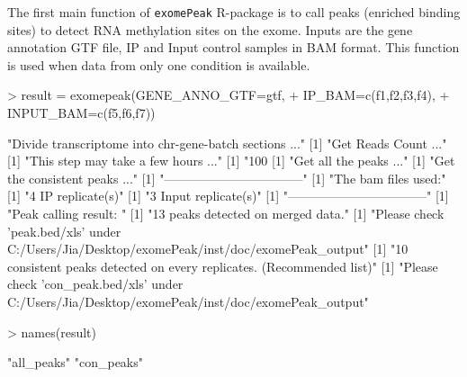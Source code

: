 \documentclass[]{article}
\newcommand{\Rfunction}[1]{{\texttt{#1}}}
\begin{document}
The first main function of \Rfunction{exomePeak} R-package is to call peaks (enriched binding sites) to detect RNA methylation sites on the exome. Inputs are the gene annotation GTF file, IP and Input control samples in BAM format. This function is used when data from only one condition is available.

\begin{Schunk}
\begin{Sinput}
> result = exomepeak(GENE_ANNO_GTF=gtf, 
+                    IP_BAM=c(f1,f2,f3,f4), 
+                    INPUT_BAM=c(f5,f6,f7))
\end{Sinput}
\begin{Soutput}
[1] "Divide transcriptome into chr-gene-batch sections ..."
[1] "Get Reads Count ..."
[1] "This step may take a few hours ..."
[1] "100 %"
[1] "Get all the peaks ..."
[1] "Get the consistent peaks ..."
[1] "---------------------------------"
[1] "The bam files used:"
[1] "4 IP replicate(s)"
[1] "3 Input replicate(s)"
[1] "---------------------------------"
[1] "Peak calling result: "
[1] "13 peaks detected on merged data."
[1] "Please check 'peak.bed/xls' under C:/Users/Jia/Desktop/exomePeak/inst/doc/exomePeak_output"
[1] "10 consistent peaks detected on every replicates. (Recommended list)"
[1] "Please check 'con_peak.bed/xls' under C:/Users/Jia/Desktop/exomePeak/inst/doc/exomePeak_output"
\end{Soutput}
\begin{Sinput}
> names(result)
\end{Sinput}
\begin{Soutput}
[1] "all_peaks" "con_peaks"
\end{Soutput}
\end{Schunk}
\end{document}

